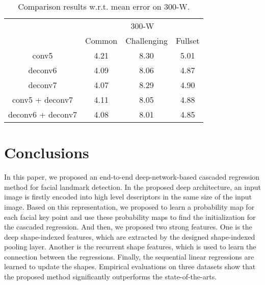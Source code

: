 \documentclass[journal]{IEEEtran}
\begin{document}
\begin{table}[h]
\small
    \centering \caption{Comparison results w.r.t. mean error on 300-W.}
    \begin{tabular}{c|c c c}
      \hline
 & \multicolumn{3}{|c}{300-W}\\
    & Common & Challenging & Fullset \\
        \hline
        conv5 & 4.21  & 8.30  & 5.01  \\
         \hline
        deconv6 & 4.09  & 8.06 & 4.87 \\
         \hline
        deconv7 & 4.07 & 8.29 & 4.90  \\
         \hline
        conv5 + deconv7 & 4.11  & 8.05 & 4.88 \\
         \hline
        deconv6 + deconv7 & 4.08  & 8.01 & 4.85 \\
         \hline
        \end{tabular}
    \label{feature_layer}
\end{table}





\section{Conclusions}
\label{conclusion}
In this paper, we proposed an end-to-end deep-network-based cascaded regression method for facial landmark detection. In the proposed deep architecture, an input image is firstly encoded into high level descriptors in the same size of the input image. Based on this representation, we proposed to learn a probability map for each facial key point and use these probability maps to find the initialization for the cascaded regression. And then, we proposed two strong features. One is the deep shape-indexed features, which are extracted by the designed shape-indexed pooling layer. Another is the recurrent shape features, which is used to learn the connection between the regressions. Finally, the sequential linear regressions are learned to update the shapes. Empirical evaluations on three datasets show that the proposed method significantly outperforms the state-of-the-arts.





\appendices







\ifCLASSOPTIONcaptionsoff
  \newpage
\fi







\end{document}
